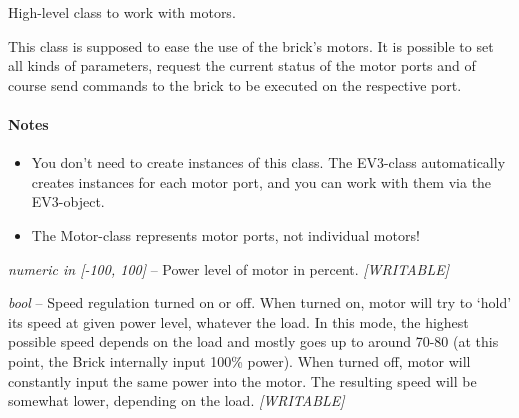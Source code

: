 \documentclass[letterpaper,10pt,english]{sphinxmanual}
\begin{document}
\begin{fulllineitems}
\label{source:source.Motor}
High-level class to work with motors.

This class is supposed to ease the use of the brick's motors. It is possible to set all
kinds of parameters, request the current status of the motor ports and of course send
commands to the brick to be executed on the respective port.
\paragraph{Notes}
\begin{itemize}
\item {} 
You don't need to create instances of this class. The EV3-class automatically creates
instances for each motor port, and you can work with them via the EV3-object.

\item {} 
The Motor-class represents motor ports, not individual motors!

\end{itemize}

\begin{fulllineitems}
\label{source:source.Motor.power}
\emph{numeric in {[}-100, 100{]}} -- Power level of motor in percent. \emph{{[}WRITABLE{]}}

\end{fulllineitems}


\begin{fulllineitems}
\label{source:source.Motor.speedRegulation}
\emph{bool} -- Speed regulation turned on or off. When turned on, motor will
try to `hold' its speed at given power level, whatever the load. In this mode, the
highest possible speed depends on the load and mostly goes up to around 70-80 (at
this point, the Brick internally input 100\% power). When turned off, motor will
constantly input the same power into the motor. The resulting speed will be
somewhat lower, depending on the load. \emph{{[}WRITABLE{]}}

\end{fulllineitems}



\end{fulllineitems}
\end{document}

